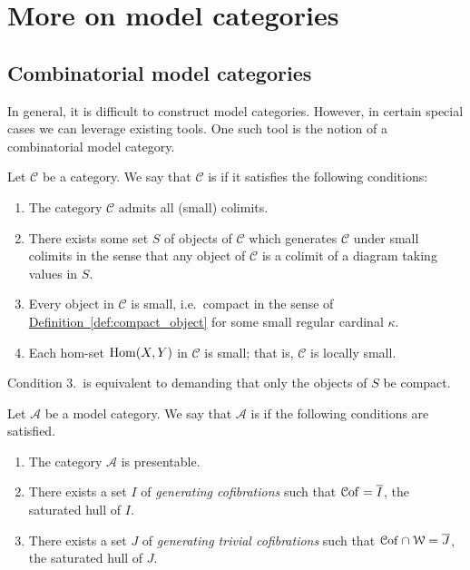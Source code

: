 \documentclass[main.tex]{subfiles}
\begin{document}
\chapter{More on model categories}
\label{ch:more_on_model_categories}

\section{Combinatorial model categories}
\label{sec:combinatorial_model_categories}

In general, it is difficult to construct model categories. However, in certain special cases we can leverage existing tools. One such tool is the notion of a combinatorial model category.

\begin{definition}
  \label{def:presentable_category}
  Let $\mathcal{C}$ be a category. We say that $\mathcal{C}$ is  if it satisfies the following conditions:
  \begin{enumerate}
    \item The category $\mathcal{C}$ admits all (small) colimits.

    \item There exists some set $S$ of objects of $\mathcal{C}$ which generates $\mathcal{C}$ under small colimits in the sense that any object of $\mathcal{C}$ is a colimit of a diagram taking values in $S$.

    \item Every object in $\mathcal{C}$ is small, i.e.\  compact in the sense of \hyperref[def:compact_object]{Definition~\ref*{def:compact_object}} for some small regular cardinal $\kappa$.

    \item Each hom-set $\operatorname{Hom}(X, Y)$ in $\mathcal{C}$ is small; that is, $\mathcal{C}$ is locally small.
  \end{enumerate}
\end{definition}

\begin{note}
  Condition 3.\ is equivalent to demanding that only the objects of $S$ be compact.
\end{note}

\begin{definition}
  \label{def:combinatorial_model_category}
  Let $\mathcal{A}$ be a model category. We say that $\mathcal{A}$ is  if the following conditions are satisfied.
  \begin{enumerate}
    \item The category $\mathcal{A}$ is presentable.

    \item There exists a set $I$ of \emph{generating cofibrations} such that $\mathcal{C}\mathrm{of} = \overline{I}$, the saturated hull of $I$.

    \item There exists a set $J$ of \emph{generating trivial cofibrations} such that $\mathcal{C}\mathrm{of} \cap \mathcal{W} = \overline{J}$, the saturated hull of $J$.
  \end{enumerate}
\end{definition}
\end{document}
